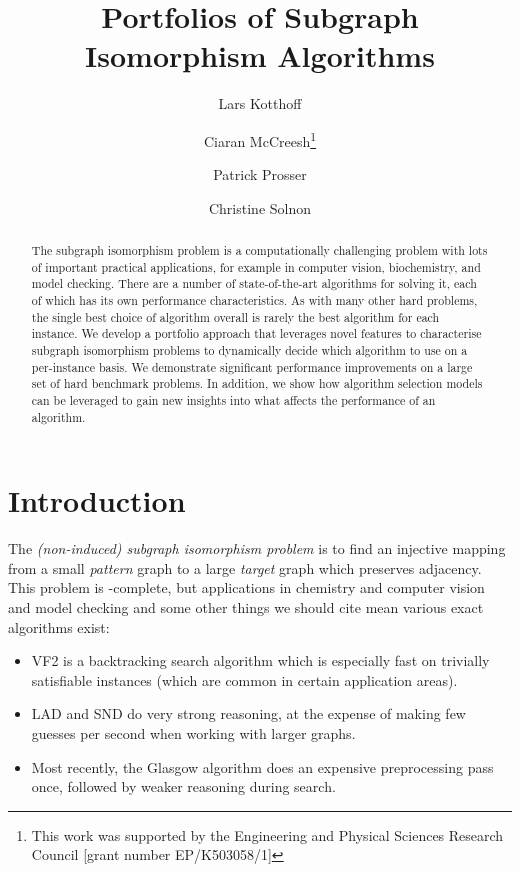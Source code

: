 \documentclass{llncs}
\title{Portfolios of Subgraph Isomorphism Algorithms}
\author{
    Lars Kotthoff\inst{1}
    \and Ciaran McCreesh\thanks{This work was supported by the Engineering
        and Physical Sciences Research Council [grant number EP/K503058/1]}\inst{2}
    \and Patrick Prosser\inst{2}
    \and Christine Solnon\inst{3}}
\institute{
    University of British Columbia, Vancouver, Canada
    \and University of Glasgow, Glasgow, Scotland
    \and INSA-Lyon, LIRIS, UMR5205, F-69621, France}
\begin{document}
\maketitle

\begin{abstract}
The subgraph isomorphism problem is a computationally challenging problem with
lots of important practical applications, for example in computer vision,
biochemistry, and model checking. There are a number of state-of-the-art
algorithms for solving it, each of which has its own performance
characteristics. As with many other hard problems, the single best choice of
algorithm overall is rarely the best algorithm for each instance. We develop a
portfolio approach that leverages novel features to characterise subgraph
isomorphism problems to dynamically decide which algorithm to use on a
per-instance basis. We demonstrate significant performance improvements on a
large set of hard benchmark problems. In addition, we show how algorithm
selection models can be leveraged to gain new insights into what affects the
performance of an algorithm.
\end{abstract}

\section{Introduction}

The \emph{(non-induced) subgraph isomorphism problem} is to find an injective mapping from a small
\emph{pattern} graph to a large \emph{target} graph which preserves adjacency. This problem is
\NP-complete, but applications in chemistry and computer vision and model checking and some other
things we should cite mean various exact algorithms exist:

\begin{itemize}
    \item VF2 \cite{Cordella:2004} is a backtracking search algorithm which is especially fast on
        trivially satisfiable instances (which are common in certain application areas).
    \item LAD \cite{Solnon:2010} and SND \cite{Audemard:2014} do very strong reasoning, at the
        expense of making few guesses per second when working with larger graphs.
    \item Most recently, the Glasgow algorithm \cite{McCreesh:2015} does an expensive preprocessing
        pass once, followed by weaker reasoning during search.
\end{itemize}
\end{document}
